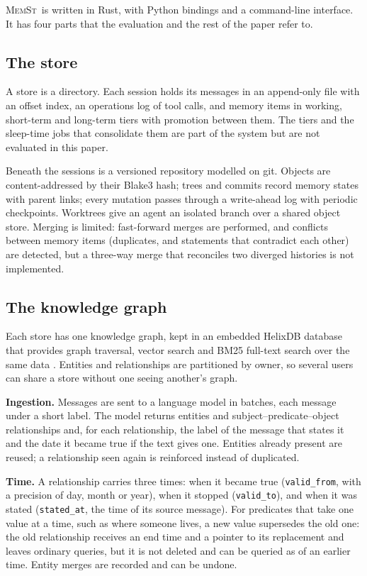 \documentclass[11pt,letterpaper]{article}
\newcommand{\memst}{\textsc{MemSt}}
\begin{document}
\memst\ is written in Rust, with Python bindings and a command-line interface. It has four parts that the evaluation and the rest of the paper refer to.

\subsection{The store}
\label{sec:storage}

A store is a directory. Each session holds its messages in an append-only file with an offset index, an operations log of tool calls, and memory items in working, short-term and long-term tiers with promotion between them. The tiers and the sleep-time jobs that consolidate them are part of the system but are not evaluated in this paper.

Beneath the sessions is a versioned repository modelled on git. Objects are content-addressed by their Blake3 hash; trees and commits record memory states with parent links; every mutation passes through a write-ahead log with periodic checkpoints. Worktrees give an agent an isolated branch over a shared object store. Merging is limited: fast-forward merges are performed, and conflicts between memory items (duplicates, and statements that contradict each other) are detected, but a three-way merge that reconciles two diverged histories is not implemented.

\subsection{The knowledge graph}
\label{sec:graph}

Each store has one knowledge graph, kept in an embedded HelixDB database that provides graph traversal, vector search and BM25 full-text search over the same data \citep{helixdb}. Entities and relationships are partitioned by owner, so several users can share a store without one seeing another's graph.

\textbf{Ingestion.} Messages are sent to a language model in batches, each message under a short label. The model returns entities and subject--predicate--object relationships and, for each relationship, the label of the message that states it and the date it became true if the text gives one. Entities already present are reused; a relationship seen again is reinforced instead of duplicated.

\textbf{Time.} A relationship carries three times: when it became true (\texttt{valid\_from}, with a precision of day, month or year), when it stopped (\texttt{valid\_to}), and when it was stated (\texttt{stated\_at}, the time of its source message). For predicates that take one value at a time, such as where someone lives, a new value supersedes the old one: the old relationship receives an end time and a pointer to its replacement and leaves ordinary queries, but it is not deleted and can be queried as of an earlier time. Entity merges are recorded and can be undone.
\end{document}
